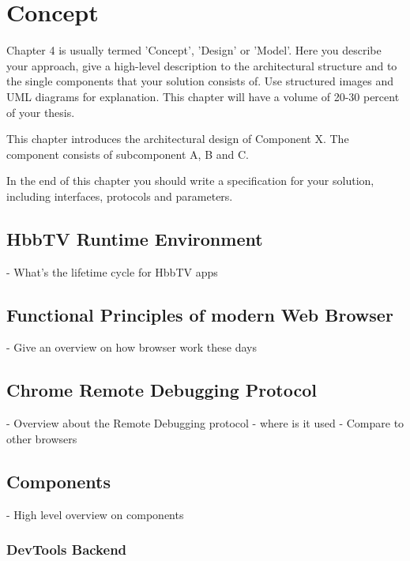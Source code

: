 \chapter{Concept\label{cha:chapter4}}

Chapter 4 is usually termed 'Concept', 'Design' or 'Model'. Here you describe your approach, give a
high-level description to the architectural structure and to the single components that your solution
consists of. Use structured images and UML diagrams for explanation. This chapter will have a volume
of 20-30 percent of your thesis.

This chapter introduces the architectural design of Component X. The component consists of
subcomponent A, B and C.

In the end of this chapter you should write a specification for your solution, including
interfaces, protocols and parameters.

\section{HbbTV Runtime Environment\label{sec:hbbtvruntimeenvironment}}

- What's the lifetime cycle for HbbTV apps

\section{Functional Principles of modern Web Browser\label{sec:howbrowserwork}}

- Give an overview on how browser work these days

\section{Chrome Remote Debugging Protocol\label{sec:crdp}}

- Overview about the Remote Debugging protocol
- where is it used
- Compare to other browsers

\section{Components\label{sec:components}}

- High level overview on components

\subsection{DevTools Backend\label{sec:devtoolsbackend}}

